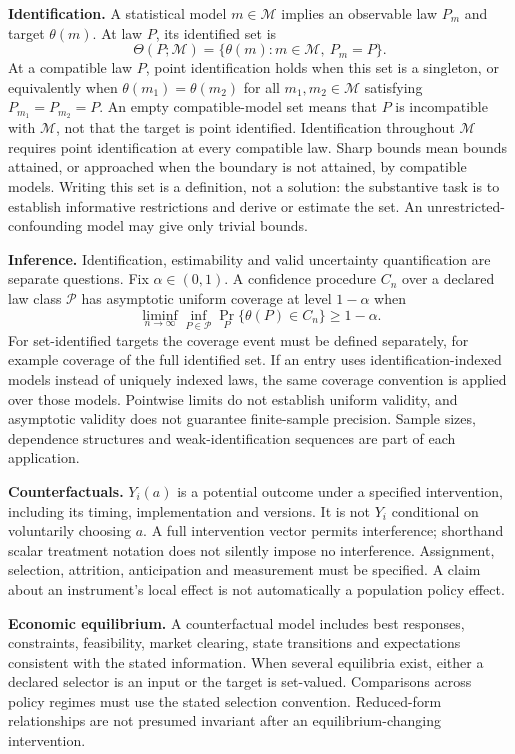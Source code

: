 \documentclass[11pt,a4paper]{article}
\begin{document}
\textbf{Identification.} A statistical model $m\in\mathcal M$ implies an observable law $P_m$ and target $\theta(m)$. At law $P$, its identified set is
\[
\Theta(P;\mathcal M)=\{\theta(m):m\in\mathcal M,\ P_m=P\}.
\]
At a compatible law $P$, point identification holds when this set is a singleton, or equivalently when $\theta(m_1)=\theta(m_2)$ for all $m_1,m_2\in\mathcal M$ satisfying $P_{m_1}=P_{m_2}=P$. An empty compatible-model set means that $P$ is incompatible with $\mathcal M$, not that the target is point identified. Identification throughout $\mathcal M$ requires point identification at every compatible law. Sharp bounds mean bounds attained, or approached when the boundary is not attained, by compatible models. Writing this set is a definition, not a solution: the substantive task is to establish informative restrictions and derive or estimate the set. An unrestricted-confounding model may give only trivial bounds.

\textbf{Inference.} Identification, estimability and valid uncertainty quantification are separate questions. Fix $\alpha\in(0,1)$. A confidence procedure $C_n$ over a declared law class $\mathcal P$ has asymptotic uniform coverage at level $1-\alpha$ when
\[
\liminf_{n\to\infty}\inf_{P\in\mathcal P}\Pr_P\{\theta(P)\in C_n\}\geq1-\alpha.
\]
For set-identified targets the coverage event must be defined separately, for example coverage of the full identified set. If an entry uses identification-indexed models instead of uniquely indexed laws, the same coverage convention is applied over those models. Pointwise limits do not establish uniform validity, and asymptotic validity does not guarantee finite-sample precision. Sample sizes, dependence structures and weak-identification sequences are part of each application.

\textbf{Counterfactuals.} $Y_i(a)$ is a potential outcome under a specified intervention, including its timing, implementation and versions. It is not $Y_i$ conditional on voluntarily choosing $a$. A full intervention vector permits interference; shorthand scalar treatment notation does not silently impose no interference. Assignment, selection, attrition, anticipation and measurement must be specified. A claim about an instrument's local effect is not automatically a population policy effect.

\textbf{Economic equilibrium.} A counterfactual model includes best responses, constraints, feasibility, market clearing, state transitions and expectations consistent with the stated information. When several equilibria exist, either a declared selector is an input or the target is set-valued. Comparisons across policy regimes must use the stated selection convention. Reduced-form relationships are not presumed invariant after an equilibrium-changing intervention.
\end{document}
